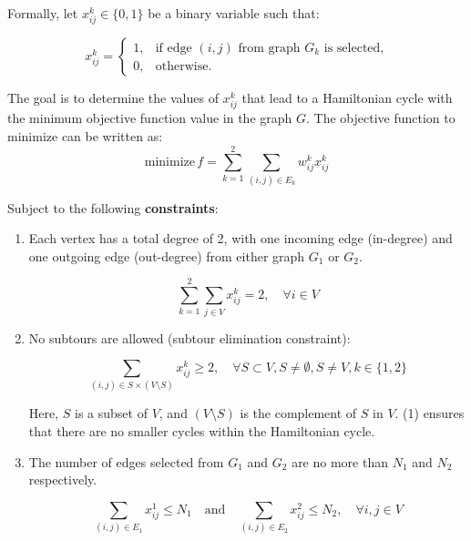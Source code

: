 \documentclass[11pt]{extarticle}
\begin{document}
Formally, let $x_{ij}^k \in \{0, 1\}$ be a binary variable such that:

\begin{equation*}
  x_{ij}^k =
  \begin{cases}
    1, & \text{if edge } (i, j) \text{ from graph } G_k \text{ is selected,} \\
    0, & \text{otherwise.}
  \end{cases}
\end{equation*}

The goal is to determine the values of $x_{ij}^k$ that lead to a Hamiltonian
cycle with the minimum objective function value in the graph $G$. The objective
function to minimize can be written as:
\begin{equation*}
  \text{minimize} \, f = \sum_{k=1}^{2} \sum_{(i,j) \in E_k} w_{ij}^k x_{ij}^k
\end{equation*}

Subject to the following \textbf{constraints}:

\begin{enumerate}
  \item Each vertex has a total degree of 2, with one incoming edge (in-degree) and one
        outgoing edge (out-degree) from either graph $G_1$ or $G_2$.

        \begin{equation*}
          \sum_{k=1}^{2} \sum_{j \in V} x_{ij}^k = 2, \quad \forall i \in V
        \end{equation*}
  \item No subtours are allowed (subtour elimination constraint):

        \begin{equation}
          \sum_{(i,j) \in S \times (V \setminus S)} x_{ij}^k \geq 2, \quad \forall S \subset V, S \neq \emptyset, S \neq V, k \in \{1, 2\}
        \end{equation}

        Here, $S$ is a subset of $V$, and $(V \setminus S)$ is the complement of $S$ in
        $V$. (1) ensures that there are no smaller cycles within the Hamiltonian cycle.
  \item The number of edges selected from $G_1$ and $G_2$ are no more than $N_1$ and
        $N_2$ respectively.

        \begin{equation*}
          \sum_{(i,j) \in E_1} x_{ij}^1 \leq N_1 \quad \text{and} \quad \sum_{(i,j) \in E_2} x_{ij}^2 \leq N_2,  \quad \forall i,j \in V
        \end{equation*}
\end{enumerate}
\end{document}
